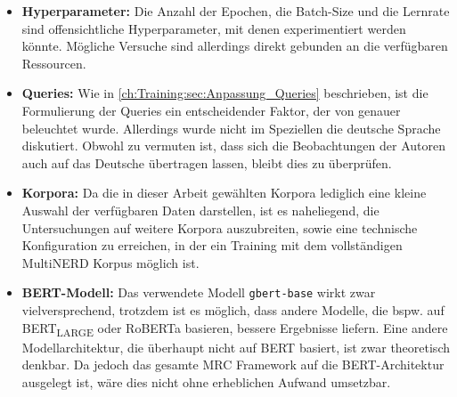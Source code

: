 \begin{itemize}
	\item \textbf{Hyperparameter:} Die Anzahl der Epochen, die Batch-Size und die Lernrate sind offensichtliche Hyperparameter, mit denen experimentiert werden könnte. Mögliche Versuche sind allerdings direkt gebunden an die verfügbaren Ressourcen.
	\item \textbf{Queries:} Wie in \autoref{ch:Training:sec:Anpassung_Queries} beschrieben, ist die Formulierung der Queries ein entscheidender Faktor, der von  genauer beleuchtet wurde. Allerdings wurde nicht im Speziellen die deutsche Sprache diskutiert. Obwohl zu vermuten ist, dass sich die Beobachtungen der Autoren auch auf das Deutsche übertragen lassen, bleibt dies zu überprüfen.
	\item \textbf{Korpora:} Da die in dieser Arbeit gewählten Korpora lediglich eine kleine Auswahl der verfügbaren Daten darstellen, ist es naheliegend, die Untersuchungen auf weitere Korpora auszubreiten, sowie eine technische Konfiguration zu erreichen, in der ein Training mit dem vollständigen MultiNERD Korpus möglich ist.
	\item \textbf{BERT-Modell:} Das verwendete Modell \verb|gbert-base| wirkt zwar vielversprechend, trotzdem ist es möglich, dass andere Modelle, die bspw. auf BERT\textsubscript{LARGE} oder RoBERTa basieren, bessere Ergebnisse liefern. Eine andere Modellarchitektur, die überhaupt nicht auf BERT basiert, ist zwar theoretisch denkbar. Da jedoch das gesamte MRC Framework auf die BERT-Architektur ausgelegt ist, wäre dies nicht ohne erheblichen Aufwand umsetzbar.
\end{itemize}

